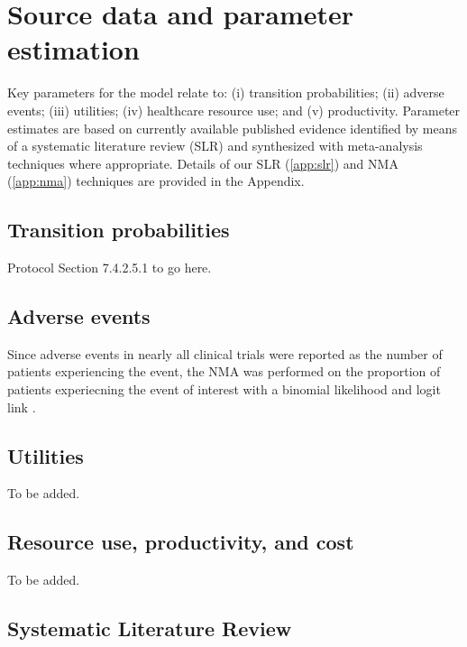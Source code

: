 \documentclass[11pt,final,fleqn]{article}\usepackage[]{graphicx}\usepackage[]{color}
\theoremstyle{plain}
\begin{document}
{\section{Source data and parameter estimation}\label{sec:data}
Key parameters for the model relate to: (i) transition probabilities; (ii) adverse events; (iii) utilities; (iv) healthcare resource use; and (v) productivity. Parameter estimates are based on currently available published evidence identified by means of a systematic literature review (SLR) and synthesized with meta-analysis techniques where appropriate. Details of our SLR (\autoref{app:slr}) and NMA (\autoref{app:nma})  techniques are provided in the Appendix. 

\subsection{Transition probabilities}\label{subsec:data-transprobs}
Protocol Section 7.4.2.5.1 to go here.

\subsection{Adverse events}\label{subsec:data-aes}
Since adverse events in nearly all clinical trials were reported as the number of patients experiencing the event, the NMA was performed on the proportion of patients experiecning the event of interest with a binomial likelihood and logit link \citep[Chapter~2]{dias2018network}.

\subsection{Utilities}\label{subsec:data-utility}
To be added.

\subsection{Resource use, productivity, and cost}\label{subsec:data-costs}
To be added.


\begin{appendices}
\setcounter{table}{0}
\renewcommand{\thetable}{A\arabic{table}}
\setcounter{figure}{0}
\renewcommand{\thefigure}{A\arabic{figure}}
\setcounter{equation}{0}
\renewcommand{\theequation}{A\arabic{equation}}

\section{Systematic Literature Review}\label{app:slr}


\end{appendices}}
\end{document}
